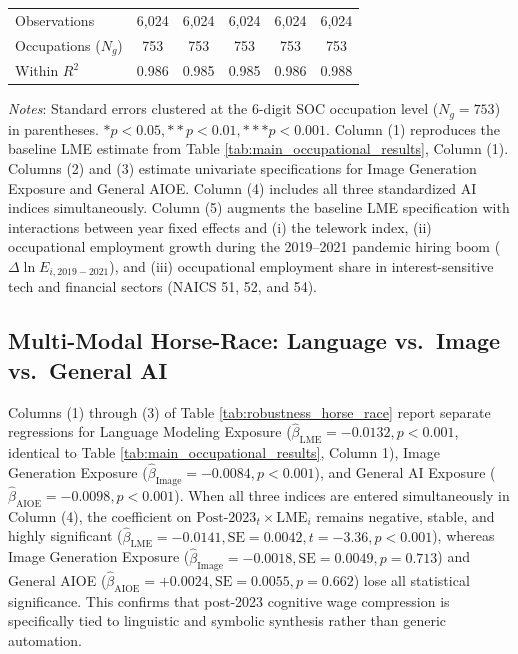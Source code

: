 \documentclass[12pt]{article}
\begin{document}
\begin{table}[htbp]
{\begin{tabular}{lccccc}
Observations & 6,024 & 6,024 & 6,024 & 6,024 & 6,024 \\
Occupations ($N_g$) & 753 & 753 & 753 & 753 & 753 \\
Within $R^2$ & 0.986 & 0.985 & 0.985 & 0.986 & 0.988 \\
\bottomrule
\end{tabular}%
}
\par\vspace{6pt}
\begin{minipage}{\linewidth}
\footnotesize
\textit{Notes}: Standard errors clustered at the 6-digit SOC occupation level ($N_g = 753$) in parentheses. $* p < 0.05, ** p < 0.01, *** p < 0.001$. Column (1) reproduces the baseline LME estimate from Table \ref{tab:main_occupational_results}, Column (1). Columns (2) and (3) estimate univariate specifications for Image Generation Exposure and General AIOE. Column (4) includes all three standardized AI indices simultaneously. Column (5) augments the baseline LME specification with interactions between year fixed effects and (i) the \citet{dingelNeiman2020} telework index, (ii) occupational employment growth during the 2019--2021 pandemic hiring boom ($\Delta \ln E_{i, 2019-2021}$), and (iii) occupational employment share in interest-sensitive tech and financial sectors (NAICS 51, 52, and 54).
\end{minipage}
\end{table}

\subsection{Multi-Modal Horse-Race: Language vs.\ Image vs.\ General AI}

Columns (1) through (3) of Table \ref{tab:robustness_horse_race} report separate regressions for Language Modeling Exposure ($\hat{\beta}_{\text{LME}} = -0.0132, p < 0.001$, identical to Table \ref{tab:main_occupational_results}, Column 1), Image Generation Exposure ($\hat{\beta}_{\text{Image}} = -0.0084, p < 0.001$), and General AI Exposure ($\hat{\beta}_{\text{AIOE}} = -0.0098, p < 0.001$). When all three indices are entered simultaneously in Column (4), the coefficient on $\text{Post-2023}_t \times \text{LME}_i$ remains negative, stable, and highly significant ($\hat{\beta}_{\text{LME}} = -0.0141, \text{SE} = 0.0042, t = -3.36, p < 0.001$), whereas Image Generation Exposure ($\hat{\beta}_{\text{Image}} = -0.0018, \text{SE} = 0.0049, p = 0.713$) and General AIOE ($\hat{\beta}_{\text{AIOE}} = +0.0024, \text{SE} = 0.0055, p = 0.662$) lose all statistical significance. This confirms that post-2023 cognitive wage compression is specifically tied to linguistic and symbolic synthesis rather than generic automation.
\end{document}
